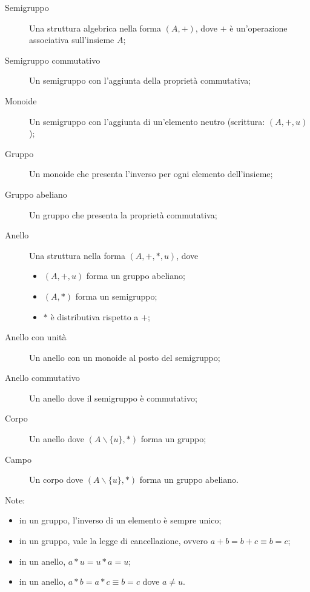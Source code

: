 \documentclass[10pt]{article}
\begin{document}
        \begin{description}
            
            \item[Semigruppo] Una struttura algebrica nella forma \((A, +)\), dove \(+\) è un'operazione associativa sull'insieme \(A\);
            \item[Semigruppo commutativo] Un semigruppo con l'aggiunta della proprietà commutativa;
            \item[Monoide] Un semigruppo con l'aggiunta di un'elemento neutro (scrittura: \((A, +, u)\));
            \item[Gruppo] Un monoide che presenta l'inverso per ogni elemento dell'insieme;
            \item[Gruppo abeliano] Un gruppo che presenta la proprietà commutativa;
            \item[Anello] Una struttura nella forma \((A, +, *, u)\), dove
                \begin{itemize}
                    \item \((A, +, u)\) forma un gruppo abeliano;
                    \item \((A, *)\) forma un semigruppo;
                    \item \(*\) è distributiva rispetto a \(+\);
                \end{itemize}
            \item[Anello con unità] Un anello con un monoide al posto del semigruppo;
            \item[Anello commutativo] Un anello dove il semigruppo è commutativo;
            \item[Corpo] Un anello dove \((A \backslash \{u\}, *)\) forma un gruppo;
            \item[Campo] Un corpo dove \((A \backslash \{u\}, *)\) forma un gruppo abeliano.

        \end{description}

        Note:
        \begin{itemize}
            \item in un gruppo, l'inverso di un elemento è sempre unico;
            \item in un gruppo, vale la legge di cancellazione, ovvero \(a + b = b + c \equiv b = c\);
            \item in un anello, \(a * u = u * a = u\);
            \item in un anello, \(a * b = a * c \equiv b = c\) dove \(a \neq u\).
        \end{itemize}
\end{document}
